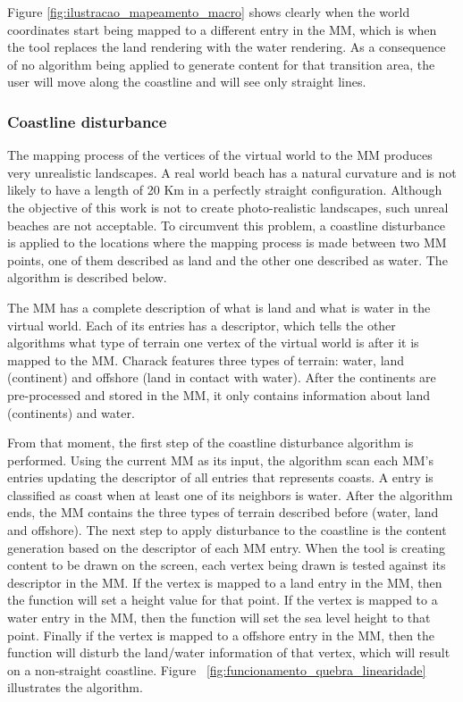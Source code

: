 \documentclass[10pt, conference, compsocconf]{IEEEtran}
\begin{document}
Figure \ref{fig:ilustracao_mapeamento_macro} shows clearly when the world coordinates start being mapped to a different entry in the MM, which is when the tool replaces the land rendering with the water rendering. As a consequence of no algorithm being applied to generate content for that transition area, the user will move along the coastline and will see only straight lines.

\subsubsection{Coastline disturbance}
\label{sec:coastline-disturbance}

The mapping process of the vertices of the virtual world to the MM produces very unrealistic landscapes. A real world beach has a natural curvature and is not likely to have a length of 20 Km in a perfectly straight configuration. Although the objective of this work is not to create photo-realistic landscapes, such unreal beaches are not acceptable. To circumvent this problem, a coastline disturbance is applied to the locations where the mapping process is made between two MM points, one of them described as land and the other one described as water. The algorithm is described below.

The MM has a complete description of what is land and what is water in the virtual world. Each of its entries has a descriptor, which tells the other algorithms what type of terrain one vertex of the virtual world is after it is mapped to the MM. Charack features three types of terrain: water, land (continent) and offshore (land in contact with water). After the continents are pre-processed and stored in the MM, it only contains information about land (continents) and water.

From that moment, the first step of the coastline disturbance algorithm is performed. Using the current MM as its input, the algorithm scan each MM's entries updating the descriptor of all entries that represents coasts. A entry is classified as coast when at least one of its neighbors is water. After the algorithm ends, the MM contains the three types of terrain described before (water, land and offshore). The next step to apply disturbance to the coastline is the content generation based on the descriptor of each MM entry. When the tool is creating content to be drawn on the screen, each vertex being drawn is tested against its descriptor in the MM. If the vertex is mapped to a land entry in the MM, then the function will set a height value for that point. If the vertex is mapped to a water entry in the MM, then the function will set the sea level height to that point. Finally if the vertex is mapped to a offshore entry in the MM, then the function will disturb the land/water information of that vertex, which will result on a non-straight coastline. Figure ~\ref{fig:funcionamento_quebra_linearidade} illustrates the algorithm. 
\end{document}
